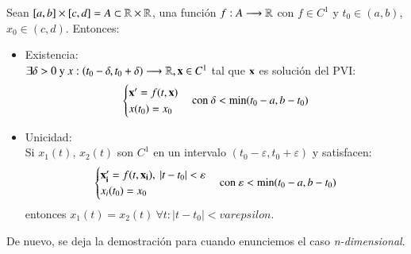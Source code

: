 \begin{thm}
    Sean $[a,b] \times [c,d] = A \subset \mathbb{R} \times \mathbb{R}$, una función $f: A \longrightarrow \mathbb{R}$ con $f \in C^1$ y $t_0\in(a,b)$, $x_0\in(c,d)$. Entonces:\\
    \begin{itemize}
        \item Existencia:\\
            $
                \exists \delta > 0 \text{ y } x:(t_0 - \delta, t_0 + \delta) \longrightarrow \mathbb{R}, \mathbf{x}\in C^1
            $ tal que $\mathbf{x}$ es solución del PVI:
            $$
                \begin{cases}
                    \mathbf{x'} = f(t, \mathbf{x})\\
                    x(t_0) = x_0
                \end{cases}
                \text{con } \delta < \min(t_0 - a, b - t_0)
            $$
        \item Unicidad:\\
        Si $x_1(t)$, $x_2(t)$ son $C^1$ en un intervalo $(t_0-\varepsilon, t_0+\varepsilon)$ y satisfacen:\\
        $$
            \begin{cases}
                \mathbf{x_i'} = f(t, \mathbf{x_i}),\ |t-t_0| < \varepsilon\\
                x_i(t_0) = x_0
            \end{cases}
            \text{con } \varepsilon < \min(t_0 - a, b - t_0)
        $$ entonces $x_1(t) = x_2(t)\ \forall t : |t-t_0| < varepsilon$.
    \end{itemize}
\end{thm}
De nuevo, se deja la demostración para cuando enunciemos el caso \textit{n-dimensional}.
